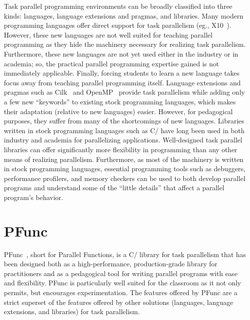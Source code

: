 \documentclass[9pt,twocolumn,letter]{article}
\begin{document}
Task parallel programming environments can be broadly classified into three
kinds: languages, language extensions and pragmas, and libraries.
Many modern programming languages offer direct support for task parallelism
(eg., X10~\cite{Charles:2005p1232}).
%
However, these new languages are not well suited for teaching parallel
programming as they hide the machinery necessary for realizing task
parallelism.
%
Furthermore, these new languages are not yet used either in the industry or in
academia; so, the practical parallel programming expertise gained is not
immediately applicable.
%
Finally, forcing students to learn a new language takes focus away from
teaching parallel programming itself.
Language extensions and pragmas such as Cilk~\cite{FrigoLeRa98} and
OpenMP~\cite{kn:omp_30} provide task parallelism while adding only a few new
``keywords'' to existing stock programming languages, which makes their
adaptation (relative to new languages) easier.
%
However, for pedagogical purposes, they suffer from many of the shortcomings of
new languages.
Libraries written in stock programming languages such as C/\Cpp{} have long 
been used in both industry and academia for parallelizing applications.
%
Well-designed task parallel libraries can offer significantly more
flexibility in programming than any other means of realizing
parallelism.
%
Furthermore, as most of the machinery is written in stock programming
languages, essential programming tools such as debuggers, performance
profilers, and memory checkers can be used to both develop parallel programs
and understand some of the ``little details'' that affect a parallel program's
behavior.

%
%
%
\section{PFunc}
\label{sec:pfunc}
PFunc~\cite{kambadur09:pfunc}, short for Parallel Functions, is a C/\Cpp{}
library for task parallelism that has been designed both as a
high-performance, production-grade library for practitioners and as a
pedagogical tool for writing parallel programs with ease and flexibility.
%
PFunc is particularly well suited for the classroom as it not only permits, but
encourages experimentation.
%
The features offered by PFunc are a strict superset of the features offered by
other solutions (languages, language extensions, and libraries) for task
parallelism.
\end{document}
